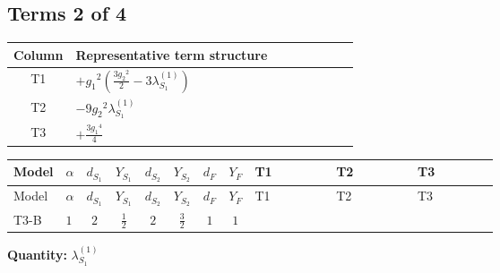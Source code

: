\documentclass[8pt]{article}
\begin{document}
\begin{landscape}
\subsection*{Terms 2 of 4}
\begin{center}
\begin{tabular}{@{}c >{\raggedright\arraybackslash}p{0.82\linewidth}@{}}
\toprule
Column & Representative term structure \\
\midrule
T1 & \(\displaystyle +{g_1}^2 \left(\frac{3 {g_2}^2}{2}-3 {\lambda_{S_1}^{(1)}}\right)\) \\
\midrule
T2 & \(\displaystyle -9 {g_2}^2 {\lambda_{S_1}^{(1)}}\) \\
\midrule
T3 & \(\displaystyle +\frac{3 {g_1}^4}{4}\) \\
\midrule
\bottomrule
\end{tabular}
\end{center}
\smallskip
\tiny
\begin{longtable}{@{}llcccccc >{\raggedright\arraybackslash}p{0.21\linewidth} >{\raggedright\arraybackslash}p{0.21\linewidth} >{\raggedright\arraybackslash}p{0.21\linewidth}@{}}
\toprule
Model & $\alpha$ & $d_{S_1}$ & $Y_{S_1}$ & $d_{S_2}$ & $Y_{S_2}$ & $d_F$ & $Y_F$ & T1 & T2 & T3 \\
\midrule
\endfirsthead
\toprule
Model & $\alpha$ & $d_{S_1}$ & $Y_{S_1}$ & $d_{S_2}$ & $Y_{S_2}$ & $d_F$ & $Y_F$ & T1 & T2 & T3 \\
\midrule
\endhead
T3-B & $1$ & $2$ & $\frac{1}{2}$ & $2$ & $\frac{3}{2}$ & $1$ & $1$ & \scriptsize\adjustbox{max width=\linewidth}{$\begin{gathered} +{g_1}^2 \left(\frac{3 {g_2}^2}{2}-3 {\lambda_{S_1}^{(1)}}\right)\end{gathered}$} & \scriptsize\adjustbox{max width=\linewidth}{$\begin{gathered} -9 {g_2}^2 {\lambda_{S_1}^{(1)}}\end{gathered}$} & \scriptsize\adjustbox{max width=\linewidth}{$\begin{gathered} +\frac{3 {g_1}^4}{4}\end{gathered}$} \\
\midrule
\bottomrule
\end{longtable}
\clearpage
\noindent\textbf{Quantity: }$\lambda_{S_1}^{(1)}$\par\smallskip

\end{landscape}
\end{document}
